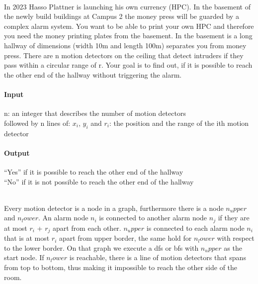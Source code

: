 



\makeheader

\\
In 2023 Hasso Plattner is launching his own currency (HPC). In the basement of the newly build buildings at Campus 2 the money press will be guarded by a complex alarm system. 
You want to be able to print your own HPC and therefore you need the money printing plates from the basement. 
In the basement is a long hallway of dimensions (width 10m and length 100m) separates you from money press. There are n motion detectors on the ceiling that detect intruders if they pass within a circular range of r. 
Your goal is to find out, if it is possible to reach the other end of the hallway without triggering the alarm. 

\paragraph*{Input}
n: an integer that describes the number of motion detectors \\
followed by n lines of:
$x_i$, $y_i$ and $r_i$: the position and the range of the ith motion detector


\paragraph*{Output}
“Yes” if it is possible to reach the other end of the hallway \\
“No” if it is not possible to reach the other end of the hallway


\begin{samples}
\end{samples}

\\
Every motion detector is a node in a graph, furthermore there is a node $n_upper$ and $n_lower$. 
An alarm node $n_i$ is connected to another alarm node $n_j$ if they are at most $r_i$ + $r_j$ apart from each other. 
$n_upper$ is connected to each alarm node $n_i$ that is at most $r_i$ apart from upper border, the same hold for $n_lower$ with respect to the lower border. 
On that graph we execute a dfs or bfs with $n_upper$ as the start node. If $n_lower$ is reachable, there is a line of motion detectors that spans from top to bottom, thus making it impossible to reach the other side of the room.

